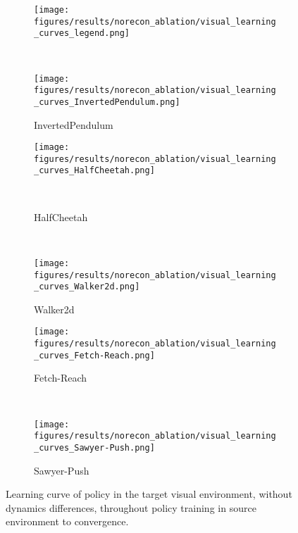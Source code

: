 \begin{figure}[ht]
    \centering
    \begin{subfigure}[t]{0.5\linewidth}
        \centering
        \texttt{[image: figures/results/norecon\_ablation/visual\_learning\_curves\_legend.png]}
    \end{subfigure}
    \\
    \begin{subfigure}[t]{0.45\linewidth}
        \centering
        \texttt{[image: figures/results/norecon\_ablation/visual\_learning\_curves\_InvertedPendulum.png]}
        \caption{InvertedPendulum}
    \end{subfigure}
    \begin{subfigure}[t]{0.45\linewidth}
        \centering
        \texttt{[image: figures/results/norecon\_ablation/visual\_learning\_curves\_HalfCheetah.png]}
        \caption{HalfCheetah}
\    \end{subfigure}
    \\
    \begin{subfigure}[t]{0.45\linewidth}
        \centering
        \texttt{[image: figures/results/norecon\_ablation/visual\_learning\_curves\_Walker2d.png]}
        \caption{Walker2d}
    \end{subfigure}
    \begin{subfigure}[t]{0.45\linewidth}
        \centering
        \texttt{[image: figures/results/norecon\_ablation/visual\_learning\_curves\_Fetch-Reach.png]}
        \caption{Fetch-Reach}
    \end{subfigure}
    \\
    \begin{subfigure}[t]{0.45\linewidth}
        \centering
        \texttt{[image: figures/results/norecon\_ablation/visual\_learning\_curves\_Sawyer-Push.png]}
        \caption{Sawyer-Push}
    \end{subfigure}
    \caption{
        Learning curve of policy in the target visual environment, without dynamics differences, throughout policy training in source environment to convergence.  
    }
\label{fig:norecon_ablation}
\end{figure}

